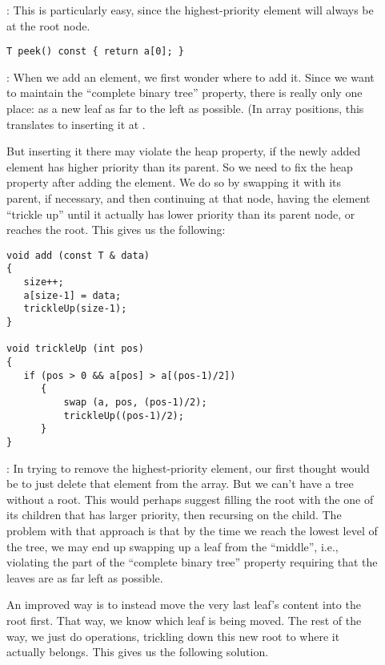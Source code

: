 \begin{description}
\item[]: This is particularly easy, since the
  highest-priority element will always be at the root node.

\begin{verbatim}
T peek() const { return a[0]; }
\end{verbatim}

\item[]: When we add an element, we first wonder where to
  add it. Since we want to maintain the ``complete binary tree''
  property, there is really only one place: as a new leaf as far to
  the left as possible. (In array positions, this translates to
  inserting it at . 

  But inserting it there may violate the heap property, if the newly
  added element has higher priority than its parent. So we need to fix
  the heap property after adding the element. We do so by swapping it
  with its parent, if necessary, and then continuing at that node,
  having the element ``trickle up'' until it actually has lower
  priority than its parent node, or reaches the root. This gives us
  the following:

\begin{verbatim}
void add (const T & data)
{
   size++;
   a[size-1] = data;
   trickleUp(size-1);
}

void trickleUp (int pos) 
{
   if (pos > 0 && a[pos] > a[(pos-1)/2])
      {
          swap (a, pos, (pos-1)/2);
          trickleUp((pos-1)/2);
      }
}
\end{verbatim}

\item[]: In trying to remove the highest-priority
  element, our first thought would be to just delete that element from
  the array. But we can't have a tree without a root. This would
  perhaps suggest filling the root with the one of its children that
  has larger priority, then recursing on the child.
  The problem with that approach is that by the time we reach the
  lowest level of the tree, we may end up swapping up a leaf
  from the ``middle'', i.e., violating the part of the ``complete
  binary tree'' property requiring that the leaves are as far left as
  possible. 

  An improved way is to instead move the very last leaf's
  content into the root first. That way, we know which leaf is being
  moved. The rest of the way, we just do  operations,
  trickling down this new root to where it actually belongs. This
  gives us the following solution.


\end{description}
